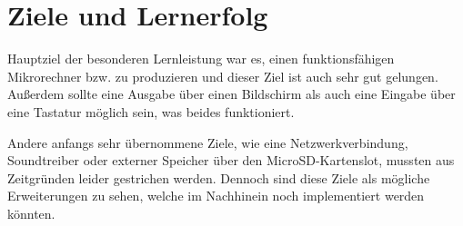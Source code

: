 \section{Ziele und Lernerfolg}
Hauptziel der besonderen Lernleistung war es, einen funktionsfähigen
Mikrorechner bzw. zu produzieren und dieser Ziel ist auch sehr gut gelungen.
Außerdem sollte eine Ausgabe über einen Bildschirm als auch eine Eingabe über
eine Tastatur möglich sein, was beides funktioniert.

Andere anfangs sehr übernommene Ziele, wie eine Netzwerkverbindung, Soundtreiber
oder externer Speicher über den MicroSD-Kartenslot, mussten aus Zeitgründen
leider gestrichen werden. Dennoch sind diese Ziele als mögliche Erweiterungen zu
sehen, welche im Nachhinein noch implementiert werden könnten.
\pagebreak

